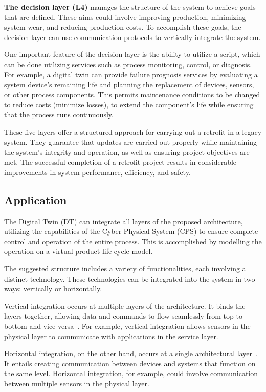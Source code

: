 \documentclass[journal]{IEEEtran}
\begin{document}
\textbf{The decision layer (L4)} manages the structure of the system to achieve goals that are defined. These aims could involve improving production, minimizing system wear, and reducing production costs. To accomplish these goals, the decision layer can use communication protocols to vertically integrate the system.

One important feature of the decision layer is the ability to utilize a script, which can be done utilizing services such as process monitoring, control, or diagnosis. For example, a digital twin can provide failure prognosis services by evaluating a system device's remaining life and planning the replacement of devices, sensors, or other process components. This permits maintenance conditions to be changed to reduce costs (minimize losses), to extend the component's life while ensuring that the process runs continuously.

These five layers offer a structured approach for carrying out a retrofit in a legacy system. They guarantee that updates are carried out properly while maintaining the system's integrity and operation, as well as ensuring project objectives are met. The successful completion of a retrofit project results in considerable improvements in system performance, efficiency, and safety.

\subsection{Application}

The Digital Twin (DT) can integrate all layers of the proposed architecture, utilizing the capabilities of the Cyber-Physical System (CPS) to ensure complete control and operation of the entire process\cite{lee2020}. This is accomplished by modelling the operation on a virtual product life cycle model.

The suggested structure includes a variety of functionalities, each involving a distinct technology. These technologies can be integrated into the system in two ways: vertically or horizontally.

Vertical integration occurs at multiple layers of the architecture. It binds the layers together, allowing data and commands to flow seamlessly from top to bottom and vice versa~\cite{pisching2018}. For example, vertical integration allows sensors in the physical layer to communicate with applications in the service layer.

Horizontal integration, on the other hand, occurs at a single architectural layer~\cite{canas2022}. It entails creating communication between devices and systems that function on the same level. Horizontal integration, for example, could involve communication between multiple sensors in the physical layer.
\end{document}
